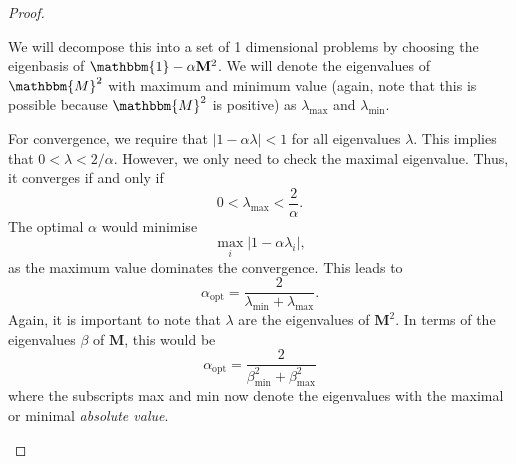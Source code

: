 \begin{proof}
\begin{parts}
	We will decompose this into a set of 1 dimensional problems by choosing the eigenbasis of $\mathbbm{1}-\alpha \mathbf{M}^2$. We will denote the eigenvalues of $\mathbbm{M}^2$ with maximum and minimum value (again, note that this is possible because $\mathbbm{M}^2$ is positive) as $\lambda_\text{max}$ and $\lambda_\text{min}$.

	For convergence, we require that $|1-\alpha \lambda|<1$ for all eigenvalues $\lambda$. This implies that $0<\lambda <2 / \alpha$. However, we only need to check the maximal eigenvalue. Thus, it converges if and only if
	 \[
		 0 < \lambda_\text{max} < \frac{2}{\alpha}
	.\] 
	The optimal $\alpha$ would minimise
	\[
	\max_i |1 - \alpha \lambda_i|
	,\]
	as the maximum value dominates the convergence. This leads to
	\[
		\alpha_\text{opt} = \frac{2}{\lambda_\text{min}+\lambda_\text{max}}
	.\] 
	Again, it is important to note that $\lambda$ are the eigenvalues of $\mathbf{M}^2$. In terms of the eigenvalues $\beta$ of $\mathbf{M}$, this would be
	\[
		\alpha_\text{opt} = \frac{2}{\beta_\text{min}^2+\beta_\text{max}^2}
	\] 
	where the subscripts max and min now denote the eigenvalues with the maximal or minimal \emph{absolute value}.\qedhere
	\end{parts}
\end{proof}
